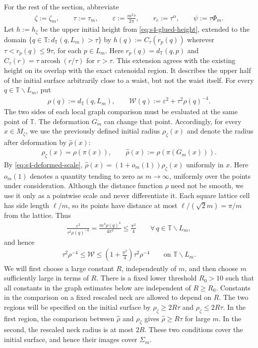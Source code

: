 \documentclass[a4paper,11pt,oneside,reqno]{amsart}
\numberwithin{equation}{section}
\theoremstyle{definition}
\begin{document}
For the rest of the section, abbreviate
%
\begin{align*}
    \zeta:=\zeta_m,\qquad \tau:=\tau_m,\qquad
    \varepsilon:=\frac{m^2\tau}{2\pi},\qquad
    r_c:=\tau^\alpha,\qquad \psi:=\tau\Phi_m.
\end{align*}
%
Let $h:=h_\zeta$ be the upper initial height from
\eqref{eq:s4-glued-height}, extended to the domain
$\{q\in\mathbb T:d_{\mathbb T}(q,L_m)>\tau\}$ by
$h(q):=C_\tau(r_p(q))$ wherever
$\tau<r_p(q)\leq9\tau$, for each $p\in L_m$.
Here $r_p(q)=d_{\mathbb T}(q,p)$ and
$C_\tau(r)=\tau\operatorname{arcosh}(r/\tau)$ for $r>\tau$.
This extension agrees with the existing height on its overlap
with the exact catenoidal region. It describes the upper
half of the initial surface arbitrarily close to a waist,
but not the waist itself.
For every $q\in\mathbb T\smallsetminus L_m$, put
%
\begin{align}
    \label{eq:s4-curvature-radius-weight}
    \rho(q):=d_{\mathbb T}(q,L_m),\qquad
    \mathcal W(q):=\varepsilon^2+\tau^2\rho(q)^{-4}.
\end{align}
%
The two sides of each local graph comparison must be evaluated
at the same point of $\mathbb T$. The deformation $G_m$ can
change that point. Accordingly, for every $x\in M_\zeta$,
we use the previously defined initial radius $\rho_\zeta(x)$
and denote the radius after deformation by $\widehat\rho(x)$:
%
\begin{align*}
    \rho_\zeta(x)=\rho(\pi(x)),\qquad
    \widehat\rho(x):=\rho(\pi(G_m(x))).
\end{align*}
%
By \eqref{eq:s4-deformed-scale},
$\widehat\rho(x)=(1+o_m(1))\rho_\zeta(x)$ uniformly in $x$.
Here $o_m(1)$ denotes a quantity tending to zero as
$m\to\infty$, uniformly over the points under consideration.
Although the distance function $\rho$ need not be smooth, we
use it only as a pointwise scale and never differentiate it.
Each square lattice cell has side length $\ell/m$, so its
points have distance at most $\ell/(\sqrt2m)=\pi/m$ from
the lattice. Thus
%
\begin{align*}
    \frac{\varepsilon^2}{\tau^2\rho(q)^{-4}}
    =\frac{m^4\rho(q)^4}{4\pi^2}
    \leq\frac{\pi^2}{4}
    \qquad\forall\,q\in\mathbb T\smallsetminus L_m,
\end{align*}
%
and hence
%
\begin{align}
    \label{eq:s4-curvature-weight-equivalence}
    \tau^2\rho^{-4}\leq\mathcal W
    \leq\left(1+\frac{\pi^2}{4}\right)\tau^2\rho^{-4}
    \qquad\text{on }\mathbb T\smallsetminus L_m.
\end{align}
%
We will first choose a large constant $R$, independently of
$m$, and then choose $m$ sufficiently large in terms of $R$.
There is a fixed lower threshold $R_0>10$ such that all constants
in the graph estimates below are independent of $R\geq R_0$.
Constants in the comparison on a fixed rescaled neck are
allowed to depend on $R$.
The two regions will be specified on the initial surface by
$\rho_\zeta\geq2R\tau$ and $\rho_\zeta\leq2R\tau$.
In the first region, the comparison between $\widehat\rho$
and $\rho_\zeta$ gives $\widehat\rho\geq R\tau$ for large
$m$. In the second, the rescaled neck radius is at most $2R$.
These two conditions cover the initial surface, and hence
their images cover $\Sigma_m$.
\end{document}

